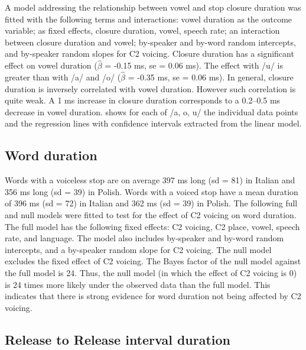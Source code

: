 \documentclass[preprint]{JASAnew}
\begin{document}
A model addressing the relationship between vowel and stop closure
duration was fitted with the following terms and interactions: vowel
duration as the outcome variable; as fixed effects, closure duration,
vowel, speech rate; an interaction between closure duration and vowel;
by-speaker and by-word random intercepts, and by-speaker random slopes
for C2 voicing. Closure duration has a significant effect on vowel
duration (\(\hat{\beta}\) = -0.15 ms, se = 0.06 ms). The effect with /u/
is greater than with /a/ and /o/ (\(\hat{\beta}\) = -0.35 ms, se = 0.06
ms). In general, closure duration is inversely correlated with vowel
duration. However such correlation is quite weak. A 1 ms increase in
closure duration corresponds to a 0.2--0.5 ms decrease in vowel
duration.  shows for each of /a, o, u/ the
individual data points and the regression lines with confidence
intervals extracted from the linear model.

\hypertarget{word-duration}{%
\subsection{Word duration}\label{word-duration}}

Words with a voiceless stop are on average 397 ms long (sd = 81) in
Italian and 356 ms long (sd = 39) in Polish. Words with a voiced stop
have a mean duration of 396 ms (sd = 72) in Italian and 362 ms (sd = 39)
in Polish. The following full and null models were fitted to test for
the effect of C2 voicing on word duration. The full model has the
following fixed effects: C2 voicing, C2 place, vowel, speech rate, and
language. The model also includes by-speaker and by-word random
intercepts, and a by-speaker random slope for C2 voicing. The null model
excludes the fixed effect of C2 voicing. The Bayes factor of the null
model against the full model is 24. Thus, the null model (in which the
effect of C2 voicing is 0) is 24 times more likely under the observed
data than the full model. This indicates that there is strong evidence
for word duration not being affected by C2 voicing.

\hypertarget{release-to-release-interval-duration}{%
\subsection{Release to Release interval
duration}\label{release-to-release-interval-duration}}
\end{document}
